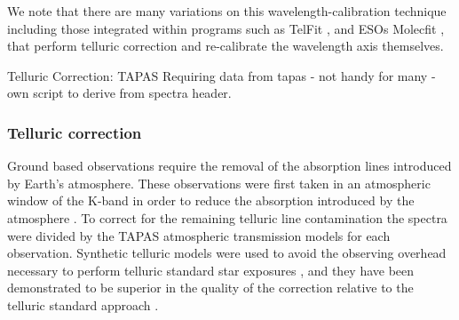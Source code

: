 We note that there are many variations on this wavelength-calibration technique including those integrated within programs such as TelFit \citet{gullikson_correcting_2014}, and ESOs Molecfit \citet{smette_molecfit_2015}, that perform telluric correction and re-calibrate the wavelength axis themselves.







Telluric Correction:
TAPAS
Requiring data from tapas
- not handy for many
- own script to derive from spectra header.


\subsubsection{Telluric correction}
\label{subsec:telluric_correction}
Ground based observations require the removal of the absorption lines introduced by Earth's atmosphere. These observations were first taken in an atmospheric window of the K-band in order to reduce the absorption introduced by the atmosphere \citep{barnes_hd_2008}. To correct for the remaining telluric line contamination the spectra were divided by the TAPAS\citep{bertaux_tapas_2014} atmospheric transmission models for each observation. Synthetic telluric models were used to avoid the observing overhead necessary to perform telluric standard star exposures \citep{vacca_method_2003}, and they have been demonstrated to be superior in the quality of the correction relative to the telluric standard approach \citep[e.g.][]{cotton_atmospheric_2014}.

